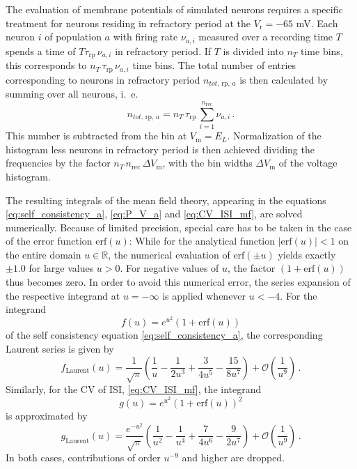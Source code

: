 The evaluation of membrane potentials of simulated neurons requires a specific treatment 
for neurons residing in refractory period at the $V_\text{r} = -65$ mV. 
Each neuron $i$ of population $a$ with firing rate $\nu_{a, i}$ measured over 
a recording time $T$ spends a time of \:$T \tau_\text{rp} \,\nu_{a, i}$\: in refractory 
period. If $T$ is divided into $n_T$ time bins, this corresponds to 
$n_T \, \tau_\text{rp} \,\nu_{a, i}$ time bins. The total number of entries 
corresponding to neurons in refractory period $n_{tot, \,\text{rp}, \,a}$ is then 
calculated by summing over all neurons, i.~e.
\begin{equation}
    n_{tot, \,\text{rp}, \,a}
        = n_T \, \tau_\text{rp} \,\sum_{i = 1}^{n_\text{rec}}\nu_{a, i} \, .
    \label{eq:n_tot_rp}
\end{equation}
This number is subtracted from the bin at $V_\text{m} = E_L$. Normalization 
of the histogram less neurons in refractory period is then
achieved dividing the frequencies by the factor $n_T \, n_\text{rec} \, \Delta V_\text{m}$, 
with the bin widths $\Delta V_\text{m}$ of the voltage histogram.

The resulting integrals of the mean field theory, appearing in the equations 
\eqref{eq:self_consistency_a}, \eqref{eq:P_V_a} and \eqref{eq:CV_ISI_mf}, 
are solved numerically. Because of limited precision, special care has to 
be taken in the case of the error function $\text{erf}(u)$:
While for the analytical 
function $|\text{erf}(u)| < 1$ on the entire domain $u \in \mathbb{R}$, 
the numerical evaluation of 
$\text{erf}(\pm u)$ yields exactly $\pm 1.0$ for large values $u > 0$. 
For negative values of $u$, the factor 
$(1 + \text{erf}(u))$ thus becomes zero.
In order to avoid this numerical error, the series expansion of
the respective integrand at $u = -\infty$ is applied whenever $u < -4$. 
For the integrand 
\begin{equation}
    f(u) = e^{u^2}\left(1 + \text{erf}(u)\right)
    \label{eq:integrand_1}
\end{equation}
of the self consistency equation \eqref{eq:self_consistency_a}, 
the corresponding Laurent series is given by
\begin{equation}
    f_\text{Laurent}(u) = 
        \frac{1}{\sqrt{\pi}} 
        \left( \frac{1}{u} - \frac{1}{2u^3} + \frac{3}{4u^5} - \frac{15}{8u^7} \right) +  
        \mathcal{O}\left( \frac{1}{u^9} \right) \,.
    \label{eq:expand_integrand_1}
\end{equation}
Similarly, for the CV of ISI, \eqref{eq:CV_ISI_mf}, the integrand 
\begin{equation}
    g(u) = e^{u^2}\left(1 + \text{erf}(u)\right)^2
    \label{eq:integrand_2}
\end{equation}
is approximated by
\begin{equation}
    g_\text{Laurent}(u) = 
    \frac{e^{-u^2}}{\sqrt{\pi}} 
        \left( \frac{1}{u^2} - \frac{1}{u^4} + \frac{7}{4u^6} - \frac{9}{2u^7} \right) +  
        \mathcal{O}\left( \frac{1}{u^9} \right) \,.
    \label{eq:expand_integrand_2}
\end{equation}
In both cases, contributions of order $u^{-9}$ and higher are dropped. 

